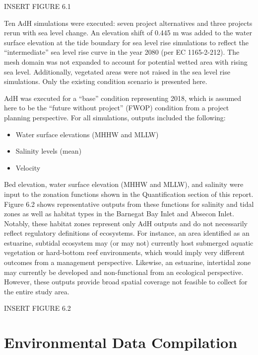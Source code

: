 \documentclass[
]{book}
\providecommand{\tightlist}{%
  \setlength{\itemsep}{0pt}\setlength{\parskip}{0pt}}
\begin{document}
{INSERT FIGURE 6.1}

Ten AdH simulations were executed: seven project alternatives and three projects rerun with sea level change. An elevation shift of 0.445 m was added to the water surface elevation at the tide boundary for sea level rise simulations to reflect the ``intermediate'' sea level rise curve in the year 2080 (per EC 1165-2-212). The mesh domain was not expanded to account for potential wetted area with rising sea level. Additionally, vegetated areas were not raised in the sea level rise simulations. Only the existing condition scenario is presented here.

AdH was executed for a ``base'' condition representing 2018, which is assumed here to be the ``future without project'' (FWOP) condition from a project planning perspective. For all simulations, outputs included the following:

\begin{itemize}
\tightlist
\item
  Water surface elevations (MHHW and MLLW)\\
\item
  Salinity levels (mean)\\
\item
  Velocity
\end{itemize}

Bed elevation, water surface elevation (MHHW and MLLW), and salinity were input to the zonation functions shown in the Quantification section of this report. Figure 6.2 shows representative outputs from these functions for salinity and tidal zones as well as habitat types in the Barnegat Bay Inlet and Absecon Inlet. Notably, these habitat zones represent only AdH outputs and do not necessarily reflect regulatory definitions of ecosystems. For instance, an area identified as an estuarine, subtidal ecosystem may (or may not) currently host submerged aquatic vegetation or hard-bottom reef environments, which would imply very different outcomes from a management perspective. Likewise, an estuarine, intertidal zone may currently be developed and non-functional from an ecological perspective. However, these outputs provide broad spatial coverage not feasible to collect for the entire study area.

{INSERT FIGURE 6.2}

\hypertarget{environmental-data-compilation}{%
\section{Environmental Data Compilation}\label{environmental-data-compilation}}
\end{document}
